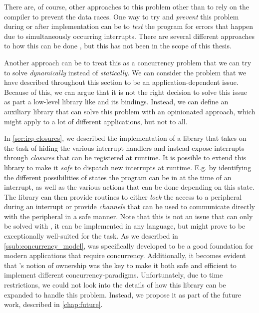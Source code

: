 There are, of course, other approaches to this problem other than to rely on the compiler to prevent the data races.
One way to try and \emph{prevent} this problem during or after implementation can be to \emph{test} the program for errors that happen due to simultaneously occurring interrupts.
There are several different approaches to how this can be done \cite{Higashi2010,Regehr2005}, but this has not been in the scope of this thesis.

Another approach can be to treat this as a concurrency problem that we can try to solve \emph{dynamically} instead of \emph{statically}.
We can consider the problem that we have described throughout this section to be an application-dependent issue.
Because of this, we can argue that it is not the right decision to solve this issue as part a low-level library like {\emlib} and its bindings.
Instead, we can define an auxiliary library that can solve this problem with an opinionated approach, which might apply to a lot of different applications, but not to all.

In \autoref{sec:irq-closures}, we described the implementation of a library that takes on the task of hiding the various interrupt handlers and instead expose interrupts through \emph{closures} that can be registered at runtime.
It is possible to extend this library to make it \emph{safe} to dispatch new interrupts at runtime.
E.g. by identifying the different possibilities of states the program can be in at the time of an interrupt, as well as the various actions that can be done depending on this state.
The library can then provide routines to either \emph{lock} the access to a peripheral during an interrupt or provide \emph{channels} that can be used to communicate directly with the peripheral in a safe manner.
Note that this is not an issue that can only be solved with {\rust}, it can be implemented in any language, but {\rust} might prove to be exceptionally well-suited for the task.
As we described in \autoref{ssub:concurrency_model}, {\rust} was specifically developed to be a good foundation for modern applications that require concurrency.
Additionally, it becomes evident that {\rust}'s notion of ownership was the key to make it both safe and efficient to implement different concurrency-paradigms.
Unfortunately, due to time restrictions, we could not look into the details of how this library can be expanded to handle this problem.
Instead, we propose it as part of the future work, described in \autoref{chap:future}.
